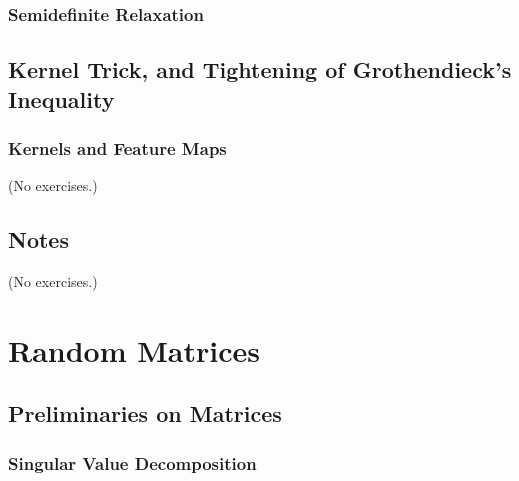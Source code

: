 \documentclass{report}
\theoremstyle{definition}
\newenvironment{exercise}[1]{
  \renewcommand\theexerciseimpl{#1}
  \exerciseimpl
}{\endexerciseimpl}
\begin{document}
\begin{exercise}{3.6.4}
\end{exercise}

\subsection{Semidefinite Relaxation}

\begin{exercise}{3.6.6}
\end{exercise}

\begin{exercise}{3.6.7}
\end{exercise}

\section{Kernel Trick, and Tightening of Grothendieck's Inequality}

\begin{exercise}{3.7.4}
\end{exercise}

\begin{exercise}{3.7.5}
\end{exercise}

\begin{exercise}{3.7.6}
\end{exercise}

\subsection{Kernels and Feature Maps}

(No exercises.)

\section{Notes}

(No exercises.)


\chapter{Random Matrices}

\section{Preliminaries on Matrices}

\subsection{Singular Value Decomposition}
\end{document}
